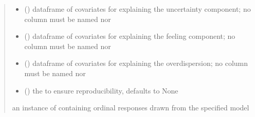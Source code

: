 \documentclass[letterpaper,10pt,english]{sphinxmanual}
\begin{document}
\begin{fulllineitems}
\begin{quote}
\begin{description}
\begin{itemize}
\item {} 
\sphinxAtStartPar
{} () \textendash{} dataframe of covariates for explaining the uncertainty component;
no column must be named  nor 

\item {} 
\sphinxAtStartPar
{} () \textendash{} dataframe of covariates for explaining the feeling component;
no column must be named  nor 

\item {} 
\sphinxAtStartPar
{} () \textendash{} dataframe of covariates for explaining the overdispersion;
no column must be named  nor 

\item {} 
\sphinxAtStartPar
{} (\sphinxstyleliteralemphasis{\sphinxupquote{, }}) \textendash{} the  to ensure reproducibility, defaults to None

\end{itemize}

\sphinxAtStartPar
an instance of  containing ordinal responses drawn from the specified model

\end{description}\end{quote}

\end{fulllineitems}

\end{document}
